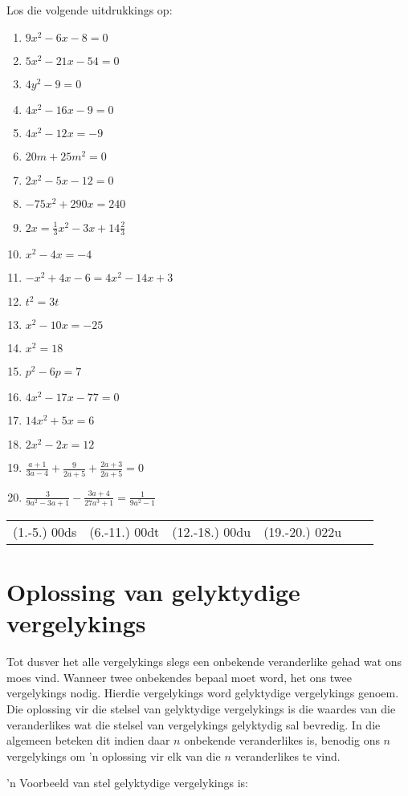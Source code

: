 \begin{exercises}{}
{Los die volgende uitdrukkings op:
\begin{multicols}{2}
\begin{enumerate}[itemsep=5pt, label=\textbf{\arabic*}. ] 
\item  $9x^{2}-6x-8=0$%
\item  $5x^{2}-21x-54=0$%
\item  $4y^{2}-9=0$%
\item  $4x^{2}-16x-9=0$%
\item  $4x^{2}-12x=-9$%
\item  $20m+25{m}^{2}=0$
\item  $2{x}^{2}-5x-12=0$  
\item  $-75{x}^{2}+290x=240$
\item  $2x=\frac{1}{3}{x}^{2}-3x+14\frac{2}{3}$
\item  ${x}^{2}-4x=-4$      
\item  $-{x}^{2}+4x-6=4{x}^{2}-14x+3$       
\item  ${t}^{2}=3t$  
\item  ${x}^{2}-10x=-25$      
\item  ${x}^{2}=18$
\item  ${p}^{2}-6p=7$
\item  $4{x}^{2}-17x-77=0$
\item  $14{x}^{2}+5x=6$
\item  $2{x}^{2}-2x=12$  
\item  $\frac{a+1}{3a-4}+\frac{9}{2a+5}+\frac{2a+3}{2a+5}=0$
\item  $\frac{3}{9a^2-3a+1}-\frac{3a+4}{27a^3+1}=\frac{1}{9a^2-1}$          
\end{enumerate}
\end{multicols}
\practiceinfo
\par 
\par\begin{tabular}[h]{cccccc}
(1.-5.) 00ds&  (6.-11.) 00dt&  (12.-18.) 00du & (19.-20.) 022u &\end{tabular}
}
\end{exercises}


\section{Oplossing van gelyktydige vergelykings}


Tot dusver het alle vergelykings slegs een onbekende veranderlike gehad wat ons moes vind.
Wanneer twee onbekendes bepaal moet word, het ons twee vergelykings nodig. Hierdie vergelykings word gelyktydige vergelykings
genoem. Die oplossing vir die stelsel van gelyktydige vergelykings is die waardes van die veranderlikes wat die stelsel van vergelykings gelyktydig sal bevredig. In die algemeen beteken dit indien daar $n$ onbekende veranderlikes is, benodig ons $n$ vergelykings om ’n oplossing vir elk van die $n$ veranderlikes te vind.\par 
’n Voorbeeld van stel gelyktydige vergelykings is:

